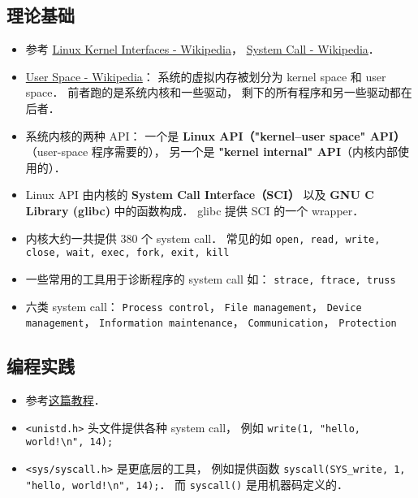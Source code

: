 
\begin{issues}
\issueDraft
\end{issues}

\subsection{理论基础}
\begin{itemize}
\item 参考 \href{https://en.wikipedia.org/wiki/Linux_kernel_interfaces}{Linux Kernel Interfaces - Wikipedia}， \href{https://en.wikipedia.org/wiki/System_call}{System Call - Wikipedia}．
\item \href{https://en.wikipedia.org/wiki/User_space_and_kernel_space}{User Space - Wikipedia}： 系统的虚拟内存被划分为 kernel space 和 user space． 前者跑的是系统内核和一些驱动， 剩下的所有程序和另一些驱动都在后者．
\item 系统内核的两种 API： 一个是 \textbf{Linux API（"kernel–user space" API）}（user-space 程序需要的）， 另一个是 \textbf{"kernel internal" API}（内核内部使用的）．
\item Linux API 由内核的 \textbf{System Call Interface（SCI）} 以及 \textbf{GNU C Library (glibc)} 中的函数构成． glibc 提供 SCI 的一个 wrapper．
\item 内核大约一共提供 380 个 system call． 常见的如 \verb|open, read, write, close, wait, exec, fork, exit, kill|
\item 一些常用的工具用于诊断程序的 system call 如： \verb|strace, ftrace, truss|
\item 六类 system call： \verb|Process control|， \verb|File management|， \verb|Device management|， \verb|Information maintenance|， \verb|Communication|， \verb|Protection|
\end{itemize}

\subsection{编程实践}
\begin{itemize}
\item 参考\href{https://jameshfisher.com/2018/02/19/how-to-syscall-in-c/}{这篇教程}．
\item \verb|<unistd.h>| 头文件提供各种 system call， 例如 \verb|write(1, "hello, world!\n", 14);|
\item \verb|<sys/syscall.h>| 是更底层的工具， 例如提供函数 \verb|syscall(SYS_write, 1, "hello, world!\n", 14);|． 而 \verb|syscall()| 是用机器码定义的．
\end{itemize}

